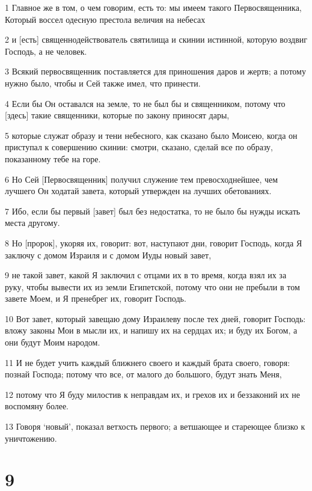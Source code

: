 \par 1 Главное же в том, о чем говорим, есть то: мы имеем такого Первосвященника, Который воссел одесную престола величия на небесах
\par 2 и [есть] священнодействователь святилища и скинии истинной, которую воздвиг Господь, а не человек.
\par 3 Всякий первосвященник поставляется для приношения даров и жертв; а потому нужно было, чтобы и Сей также имел, что принести.
\par 4 Если бы Он оставался на земле, то не был бы и священником, потому что [здесь] такие священники, которые по закону приносят дары,
\par 5 которые служат образу и тени небесного, как сказано было Моисею, когда он приступал к совершению скинии: смотри, сказано, сделай все по образу, показанному тебе на горе.
\par 6 Но Сей [Первосвященник] получил служение тем превосходнейшее, чем лучшего Он ходатай завета, который утвержден на лучших обетованиях.
\par 7 Ибо, если бы первый [завет] был без недостатка, то не было бы нужды искать места другому.
\par 8 Но [пророк], укоряя их, говорит: вот, наступают дни, говорит Господь, когда Я заключу с домом Израиля и с домом Иуды новый завет,
\par 9 не такой завет, какой Я заключил с отцами их в то время, когда взял их за руку, чтобы вывести их из земли Египетской, потому что они не пребыли в том завете Моем, и Я пренебрег их, говорит Господь.
\par 10 Вот завет, который завещаю дому Израилеву после тех дней, говорит Господь: вложу законы Мои в мысли их, и напишу их на сердцах их; и буду их Богом, а они будут Моим народом.
\par 11 И не будет учить каждый ближнего своего и каждый брата своего, говоря: познай Господа; потому что все, от малого до большого, будут знать Меня,
\par 12 потому что Я буду милостив к неправдам их, и грехов их и беззаконий их не воспомяну более.
\par 13 Говоря `новый', показал ветхость первого; а ветшающее и стареющее близко к уничтожению.

\chapter{9}

